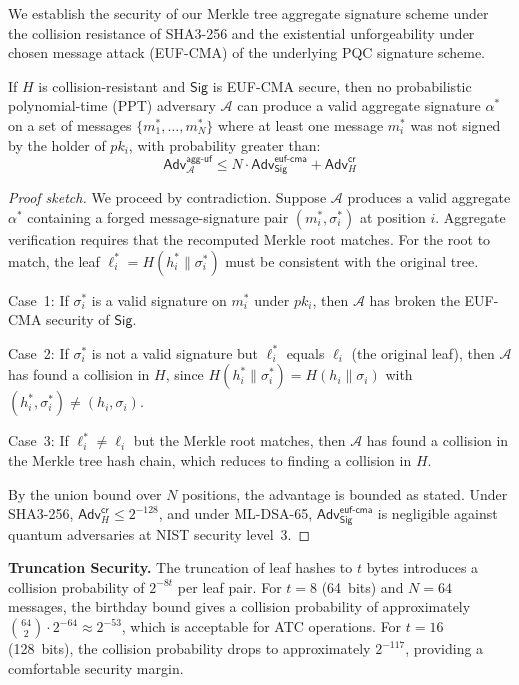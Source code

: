 \documentclass[conference,10pt]{IEEEtran}
\begin{document}
We establish the security of our Merkle tree aggregate signature scheme under the collision resistance of SHA3-256 and the existential unforgeability under chosen message attack (EUF-CMA) of the underlying PQC signature scheme.

\begin{theorem}
If $H$ is collision-resistant and $\mathsf{Sig}$ is EUF-CMA secure, then no probabilistic polynomial-time (PPT) adversary $\mathcal{A}$ can produce a valid aggregate signature $\alpha^*$ on a set of messages $\{m_1^*, \ldots, m_N^*\}$ where at least one message $m_i^*$ was not signed by the holder of $pk_i$, with probability greater than:
\begin{equation}
    \mathsf{Adv}^{\mathsf{agg\text{-}uf}}_\mathcal{A} \leq N \cdot \mathsf{Adv}^{\mathsf{euf\text{-}cma}}_\mathsf{Sig} + \mathsf{Adv}^{\mathsf{cr}}_H
\end{equation}
\end{theorem}

\begin{proof}[Proof sketch]
We proceed by contradiction. Suppose $\mathcal{A}$ produces a valid aggregate $\alpha^*$ containing a forged message-signature pair $(m_i^*, \sigma_i^*)$ at position $i$. Aggregate verification requires that the recomputed Merkle root matches. For the root to match, the leaf $\ell_i^* = H(h_i^* \| \sigma_i^*)$ must be consistent with the original tree.

Case~1: If $\sigma_i^*$ is a valid signature on $m_i^*$ under $pk_i$, then $\mathcal{A}$ has broken the EUF-CMA security of $\mathsf{Sig}$.

Case~2: If $\sigma_i^*$ is not a valid signature but $\ell_i^*$ equals $\ell_i$ (the original leaf), then $\mathcal{A}$ has found a collision in $H$, since $H(h_i^* \| \sigma_i^*) = H(h_i \| \sigma_i)$ with $(h_i^*, \sigma_i^*) \neq (h_i, \sigma_i)$.

Case~3: If $\ell_i^* \neq \ell_i$ but the Merkle root matches, then $\mathcal{A}$ has found a collision in the Merkle tree hash chain, which reduces to finding a collision in $H$.

By the union bound over $N$ positions, the advantage is bounded as stated. Under SHA3-256, $\mathsf{Adv}^{\mathsf{cr}}_H \leq 2^{-128}$, and under ML-DSA-65, $\mathsf{Adv}^{\mathsf{euf\text{-}cma}}_\mathsf{Sig}$ is negligible against quantum adversaries at NIST security level~3.
\end{proof}

\textbf{Truncation Security.} The truncation of leaf hashes to $t$ bytes introduces a collision probability of $2^{-8t}$ per leaf pair. For $t=8$ (64~bits) and $N=64$ messages, the birthday bound gives a collision probability of approximately $\binom{64}{2} \cdot 2^{-64} \approx 2^{-53}$, which is acceptable for ATC operations. For $t=16$ (128~bits), the collision probability drops to approximately $2^{-117}$, providing a comfortable security margin.
\end{document}
